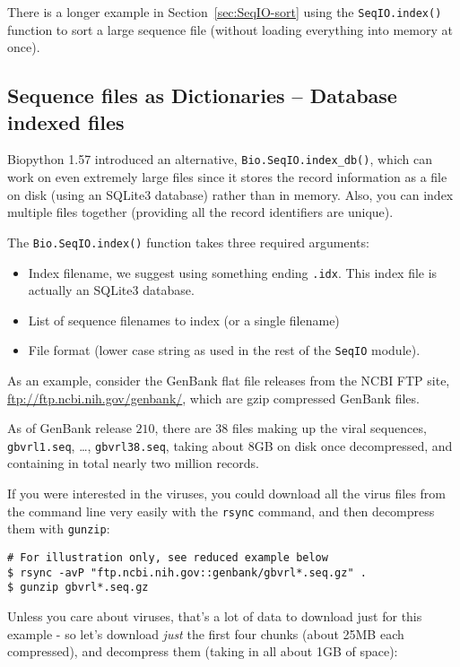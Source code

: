 There is a longer example in Section~\ref{sec:SeqIO-sort} using the
\verb|SeqIO.index()| function to sort a large sequence file (without
loading everything into memory at once).

\subsection{Sequence files as Dictionaries -- Database indexed files}
\label{sec:SeqIO-index-db}

Biopython 1.57 introduced an alternative, \verb|Bio.SeqIO.index_db()|, which
can work on even extremely large files since it stores the record information
as a file on disk (using an SQLite3 database) rather than in memory. Also,
you can index multiple files together (providing all the record identifiers
are unique).

The \verb|Bio.SeqIO.index()| function takes three required arguments:
\begin{itemize}
\item Index filename, we suggest using something ending \texttt{.idx}.
This index file is actually an SQLite3 database.
\item List of sequence filenames to index (or a single filename)
\item File format (lower case string as used in the rest of the
\verb|SeqIO| module).
\end{itemize}

As an example, consider the GenBank flat file releases from the NCBI FTP site,
\url{ftp://ftp.ncbi.nih.gov/genbank/}, which are gzip compressed GenBank files.

As of GenBank release $210$, there are $38$ files making up the viral sequences,
\texttt{gbvrl1.seq}, \ldots, \texttt{gbvrl38.seq}, taking about 8GB on disk once
decompressed, and containing in total nearly two million records.

If you were interested in the viruses, you could download all the virus files
from the command line very easily with the \texttt{rsync} command, and then
decompress them with \texttt{gunzip}:

\begin{verbatim}
# For illustration only, see reduced example below
$ rsync -avP "ftp.ncbi.nih.gov::genbank/gbvrl*.seq.gz" .
$ gunzip gbvrl*.seq.gz
\end{verbatim}

Unless you care about viruses, that's a lot of data to download just for this
example - so let's download \emph{just} the first four chunks (about 25MB each
compressed), and decompress them (taking in all about 1GB of space):

